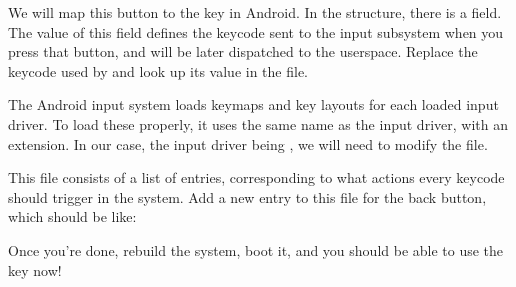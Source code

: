 We will map this button to the  key in Android. In the
 structure, there is a  field. The
value of this field defines the keycode sent to the input subsystem
when you press that button, and will be later dispatched to the
userspace. Replace the keycode used by  and look up its
value in the  file.

The Android input system loads keymaps and key layouts for each loaded
input driver. To load these properly, it uses the same name as the
input driver, with an extension. In our case, the input driver being
, we will need to modify the  file.

This file consists of a list of entries, corresponding to what actions
every keycode should trigger in the system. Add a new entry to this
file for the back button, which should be like:

Once you're done, rebuild the system, boot it, and you should be able
to use the  key now!
